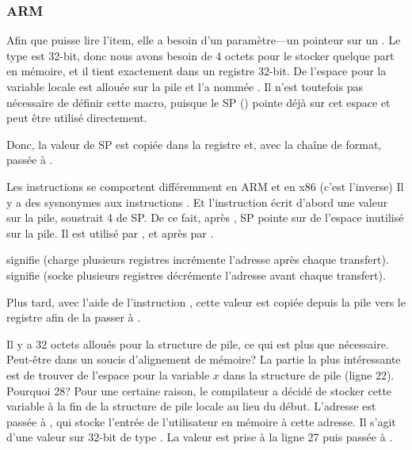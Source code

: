\subsubsection{ARM}

\myparagraph{\OptimizingKeilVI (\ThumbMode)}



\myindex{\CLanguageElements!\Pointers}

Afin que \scanf puisse lire l'item, elle a besoin d'un paramètre---un pointeur sur un \Tint.
Le type \Tint est 32-bit, donc nous avons besoin de 4 octets pour le stocker quelque
part en mémoire, et il tient exactement dans un registre 32-bit.
De l'espace pour la variable locale  est allouée sur la pile et \IDA l'a
nommée . Il n'est toutefois pas nécessaire de définir cette macro, puisque
le \ac{SP} () pointe déjà sur cet espace et
peut être utilisé directement.

Donc, la valeur de \ac{SP} est copiée dans la registre  et, avec la chaîne
de format, passée à \scanf.

Les instructions  se comportent différemment en ARM et en x86 (c'est l'inverse)
Il y a des sysnonymes aux instructions .
Et l'instruction  écrit d'abord une valeur sur la pile, 
soustrait 4 de \ac{SP}.
De ce fait, après , \ac{SP} pointe sur de l'espace inutilisé sur la pile.
Il est utilisé par \scanf, et après par \printf.

 signifie 
(charge plusieurs registres incrémente l'adresse après chaque transfert).
 signifie 
(socke plusieurs registres décrémente l'adresse avant chaque transfert).

Plus tard, avec l'aide de l'instruction , cette valeur est copiée depuis
la pile vers le registre  afin de la passer à \printf.




Il y a 32 octets alloués pour la structure de pile, ce qui est plus que nécessaire.
Peut-être dans un soucis d'alignement de mémoire?
La partie la plus intéressante est de trouver de l'espace pour la variable $x$ dans
la structure de pile (ligne 22).
Pourquoi 28? Pour une certaine raison, le compilateur a décidé de stocker cette
variable à la fin de la structure de pile locale au lieu du début.
L'adresse est passée à \scanf, qui stocke l'entrée de l'utilisateur en mémoire à
cette adresse.
Il s'agit d'une valeur sur 32-bit de type \Tint.
La valeur est prise à la ligne 27 puis passée à \printf.

